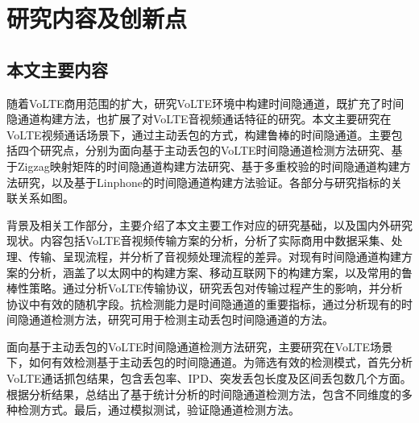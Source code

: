 \section{研究内容及创新点}
\label{sec:intro:work}

\subsection{本文主要内容}
\label{sec:intro:work:mainwork}

随着VoLTE商用范围的扩大，研究VoLTE环境中构建时间隐通道，既扩充了时间隐通道构建方法，也扩展了对VoLTE音视频通话特征的研究。本文主要研究在VoLTE视频通话场景下，通过主动丢包的方式，构建鲁棒的时间隐通道。主要包括四个研究点，分别为面向基于主动丢包的VoLTE时间隐通道检测方法研究、基于Zigzag映射矩阵的时间隐通道构建方法研究、基于多重校验的时间隐通道构建方法研究，以及基于Linphone的时间隐通道构建方法验证。各部分与研究指标的关联关系如图。


背景及相关工作部分，主要介绍了本文主要工作对应的研究基础，以及国内外研究现状。内容包括VoLTE音视频传输方案的分析，分析了实际商用中数据采集、处理、传输、呈现流程，并分析了音视频处理流程的差异。对现有时间隐通道构建方案的分析，涵盖了以太网中的构建方案、移动互联网下的构建方案，以及常用的鲁棒性策略。通过分析VoLTE传输协议，研究丢包对传输过程产生的影响，并分析协议中有效的随机字段。抗检测能力是时间隐通道的重要指标，通过分析现有的时间隐通道检测方法，研究可用于检测主动丢包时间隐通道的方法。

面向基于主动丢包的VoLTE时间隐通道检测方法研究，主要研究在VoLTE场景下，如何有效检测基于主动丢包的时间隐通道。为筛选有效的检测模式，首先分析VoLTE通话抓包结果，包含丢包率、IPD、突发丢包长度及区间丢包数几个方面。根据分析结果，总结出了基于统计分析的时间隐通道检测方法，包含不同维度的多种检测方式。最后，通过模拟测试，验证隐通道检测方法。


